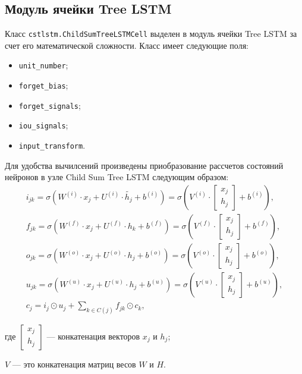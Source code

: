 \subsection{Модуль ячейки Tree LSTM}
Класс \texttt{cstlstm.ChildSumTreeLSTMCell} выделен в модуль ячейки Tree LSTM за счет его математической сложности. Класс имеет следующие поля:
\begin{itemize}
\item \texttt{unit\_number};
\item \texttt{forget\_bias};
\item \texttt{forget\_signals};
\item \texttt{iou\_signals};
\item \texttt{input\_transform}.
\end{itemize}
Для удобства вычилсений произведены приобразование рассчетов состояний нейронов в узле Child Sum Tree LSTM следующим образом:
\begin{gather}
  \label{eq:func:lstm:i}
  i_{jk} = \sigma(W^{(i)}\cdot{x_j} + U^{(i)}\cdot{\tilde{h_j}} + b^{(i)}) = \sigma({V^{(i)}\cdot{
      \begin{bmatrix}
        x_j\\
        h_j
      \end{bmatrix}} + b^{(i)}}),\\
  \label{eq:func:lstm:forget}
  f_{jk} = \sigma(W^{(f)}\cdot{x_j} + U^{(f)}\cdot{h_k} + b^{(f)}) = \sigma({V^{(f)}\cdot{
      \begin{bmatrix}
        x_j\\
        h_j
      \end{bmatrix}} + b^{(f)}}),\\
  \label{eq:func:lstm:o}
  o_{jk} = \sigma(W^{(o)}\cdot{x_j} + U^{(o)}\cdot{h_j} + b^{(o)}) = \sigma({V^{(o)}\cdot{
      \begin{bmatrix}
        x_j\\
        h_j
      \end{bmatrix}} + b^{(o)}}),\\
  \label{eq:func:lstm:u}
  u_{jk} = \sigma(W^{(u)}\cdot{x_j} + U^{(u)}\cdot{h_j} + b^{(u)}) = \sigma({V^{(u)}\cdot{
      \begin{bmatrix}
        x_j\\
        h_j
      \end{bmatrix}} + b^{(u)}}),\\
  \label{eq:func:lstm:transform}
  c_j = i_j\odot{u_j} + \sum_{k\in{C(j)}}f_{jk}\odot{c_k},
\end{gather}
\begin{explanationx}
\item [где]       $\begin{bmatrix}x_j\\h_j\end{bmatrix}$ --- конкатенация векторов $x_j$ и $h_j$;
\item $V$ --- это конкатенация матриц весов $W$ и $H$.
\end{explanationx}

